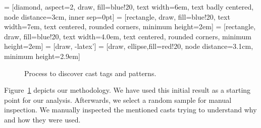  = [diamond, aspect=2, draw, fill=blue!20, 
    text width=6em, text badly centered, node distance=3cm, inner sep=0pt]
 = [rectangle, draw, fill=blue!20, 
    text width=7em, text centered, rounded corners, minimum height=2em]
 = [rectangle, draw, fill=blue!20, 
    text width=4.0em, text centered, rounded corners, minimum height=2em]
 = [draw, -latex']
 = [draw, ellipse,fill=red!20, node distance=3.1cm,
    minimum height=2.9em]

\begin{figure}
\centering
{}
\caption{Process to discover cast tags and patterns.} \label{fig:process}
\end{figure}

Figure~\ref{fig:process} depicts our methodology.
We have used this initial result as a starting point for our analysis.
Afterwards, we select a random sample for manual inspection.
We manually inspected the mentioned casts trying to understand
why and how they were used.

